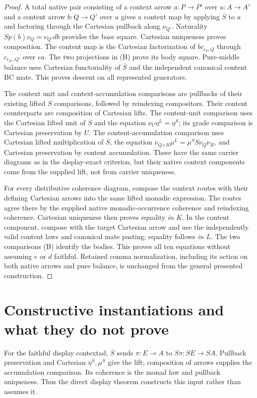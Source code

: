 \documentclass[11pt]{article}
\begin{document}
\begin{proof}
A total native pair consisting of a context arrow $a:P\to P'$ over $u:A\to A'$ and a content arrow $b:Q\to Q'$ over $u$ gives a context map by applying $\overline S$ to $a$ and factoring through the Cartesian pullback along $\nu_{Q'}$. Naturality $Sp(b)\nu_Q=\nu_{Q'}db$ provides the base square. Cartesian uniqueness proves composition. The content map is the Cartesian factorization of $bc_{\epsilon_P,Q}$ through $c_{\epsilon_{P'},Q'}$ over $ea$. The two projections in (B) prove its body square. Pure-middle balance uses Cartesian functoriality of $\overline S$ and the independent canonical content BC mate. This proves descent on all represented generators.

The context unit and context-accumulation comparisons are pullbacks of their existing lifted $S$ comparisons, followed by reindexing compositors. Their content counterparts are composition of Cartesian lifts. The content-unit comparison uses the Cartesian lifted unit of $\overline S$ and the equation $\nu_U\eta^L=\eta^S$; its grade comparison is Cartesian preservation by $U$. The content-accumulation comparison uses Cartesian lifted multiplication of $\overline S$, the equation $\nu_{Q\diamond R}\mu^L=\mu^S S\nu_Q\nu_R$, and Cartesian preservation by content accumulation. These have the same carrier diagrams as in the display-exact criterion, but their native context components come from the supplied lift, not from carrier uniqueness.

For every distributive coherence diagram, compose the context routes with their defining Cartesian arrows into the same lifted monadic expression. The routes agree there by the supplied native monadic-occurrence coherence and reindexing coherence. Cartesian uniqueness then proves equality \emph{in $K$}. In the content component, compose with the target Cartesian arrow and use the independently valid content laws and canonical mate pasting; equality follows \emph{in $L$}. The two comparisons (B) identify the bodies. This proves all ten equations without assuming $e$ or $d$ faithful. Retained comma normalization, including its action on both native arrows and pure balance, is unchanged from the general presented construction.
\end{proof}

\section{Constructive instantiations and what they do not prove}
For the faithful display contextad, $\overline S$ sends $\pi:E\to A$ to $S\pi:SE\to SA$. Pullback preservation and Cartesian $\eta^S,\mu^S$ give the lift; composition of arrows supplies the accumulation comparison. Its coherence is the monad law and pullback uniqueness. Thus the direct display theorem constructs this input rather than assumes it.
\end{document}

